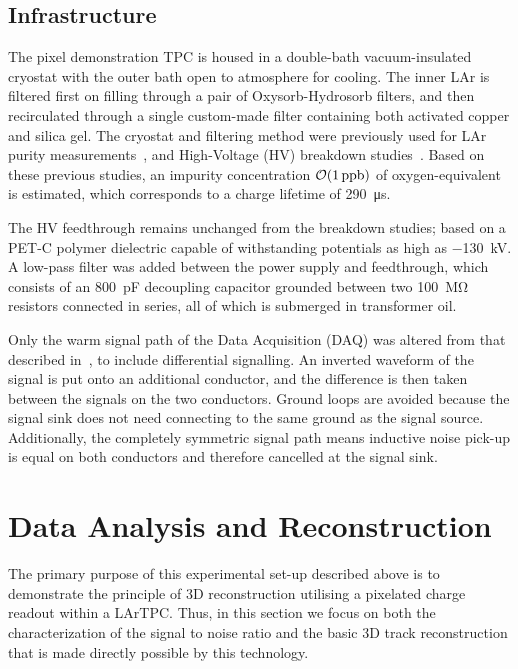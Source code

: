 \documentclass[a4paper]{article}
\begin{document}
\subsection{Infrastructure}

The pixel demonstration TPC is housed in a double-bath vacuum-insulated cryostat with the outer bath open to atmosphere for cooling.
The inner LAr is filtered first on filling through a pair of Oxysorb-Hydrosorb filters, and then recirculated through a single custom-made filter containing both activated copper and silica gel.
The cryostat and filtering method were previously used for LAr purity measurements~\cite{purititty}, and High-Voltage (HV) breakdown studies~\cite{HVoriginal}.
Based on these previous studies, an impurity concentration $\order{\SI{1}{ppb}}$ of oxygen-equivalent is estimated, which corresponds to a charge lifetime of \SI{290}{\micro\second}.

The HV feedthrough remains unchanged from the breakdown studies; based on a PET-C polymer dielectric capable of withstanding potentials as high as \SI{-130}{\kilo\volt}.
A low-pass filter was added between the power supply and feedthrough, which consists of an \SI{800}{\pico\farad} decoupling capacitor grounded between two \SI{100}{\mega\ohm} resistors connected in series, all of which is submerged in transformer oil.  

Only the warm signal path of the Data Acquisition (DAQ) was altered from that described in~\cite{protoLASER}, to include differential signalling.
An inverted waveform of the signal is put onto an additional conductor, and the difference is then taken between the signals on the two conductors.
Ground loops are avoided because the signal sink does not need connecting to the same ground as the signal source.
Additionally, the completely symmetric signal path means inductive noise pick-up is equal on both conductors and therefore cancelled at the signal sink.

\section{Data Analysis and Reconstruction} \label{sec:results}

The primary purpose of this experimental set-up described above is to demonstrate the principle of 3D reconstruction utilising a pixelated charge readout within a LArTPC. 
Thus, in this section we focus on both the characterization of the signal to noise ratio and the basic 3D track reconstruction that is made directly possible by this technology.
 
\end{document}
